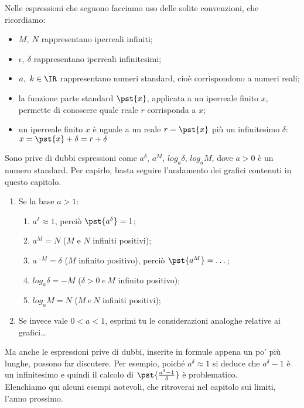 Nelle espressioni che seguono facciamo uso delle solite convenzioni, che 
ricordiamo:
\begin{itemize}[nosep]
 \item $M, \ N$ rappresentano iperreali infiniti;
 \item $\epsilon, \ \delta$ rappresentano iperreali infinitesimi;
 \item $a, \ k \in \IR$ rappresentano numeri standard, cioè corrispondono a 
numeri reali;
 \item la funzione parte standard $\pst{x}$, applicata a un iperreale 
finito $x$, permette di conoscere quale reale $r$ corrisponda a $x$; 
 \item un iperreale finito $x$ è uguale a un reale $r=\pst{x}$ più un 
infinitesimo $\delta$: \\
\(x=\pst{x}+\delta=r+\delta\)
\end{itemize}

Sono prive di dubbi espressioni come \(a^\delta\), \(a^M\), 
\(log_a\delta\), \(log_a M\), dove \(a>0\) è un numero standard. Per 
capirlo, basta seguire l'andamento dei grafici contenuti in questo 
capitolo. 
\begin{enumerate}[nosep]
 \item Se la base $a>1$:
  \begin{enumerate}[nosep]
   \item \(a^\delta \approx 1\), perciò \(\pst{a^\delta}=1\);
   \item \(a^M = N\) ($M$ e $N$ infiniti positivi);
   \item \(a^{-M} = \delta\) ($M$ infinito positivo), perciò 
   \(\pst{a^M}=\dots\);
   \item $log_a \delta= -M$ ($\delta >0 ~ e ~ M$ infinito positivo);
   \item $log_a M= N$ ($M ~ e ~ N$ infiniti positivi);
  \end{enumerate}
 \item Se invece vale $0<a<1$, esprimi tu le considerazioni analoghe 
relative ai grafici\dots
\end{enumerate}

Ma anche le espressioni prive di dubbi, inserite in formule appena un po' 
più lunghe, possono far discutere. Per esempio, poiché 
\(a^\delta \approx 1\) si deduce che \(a^\delta -  1\) è un infinitesimo e 
quindi il calcolo di $\pst{\frac{a^\delta -  1}{\delta}}$ è problematico.\\
Elenchiamo qui alcuni esempi notevoli, che ritroverai nel capitolo sui 
limiti, l'anno prossimo.\\

